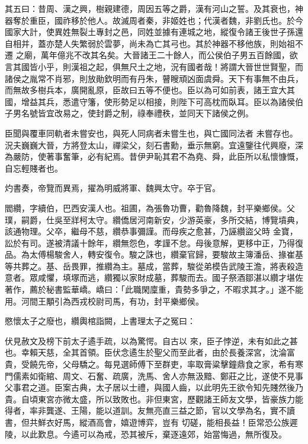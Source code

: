 \begin{pinyinscope}
 其五曰：昔周、漢之興，樹親建德，周因五等之爵，漢有河山之誓。及其衰也，神器奪於重臣，國祚移於他人。故滅周者秦，非姬姓也；代漢者魏，非劉氏也。於今國家大計，使異姓無裂土專封之邑，同姓並據有連城之地，縱復令諸王後世子孫還自相并，蓋亦楚人失繁弱於雲夢，尚未為亡其弓也。其於神器不移他族，則始祖不遷
 之廟，萬年億兆不改其名矣。大晉諸王二十餘人，而公侯伯子男五百餘國，欲言其國皆小乎，則漢祖之起，俱無尺土之地，況有國者哉！將謂大晉世世賢聖，而諸侯之胤常不肖邪，則放勛欽明而有丹朱，瞽瞍頑凶面虞舜。天下有事無不由兵，而無故多樹兵本，廣開亂原，臣故曰五等不便也。臣以為可如前表，諸王宜大其國，增益其兵，悉遣守籓，使形勢足以相接，則陛下可高枕而臥耳。臣以為諸侯伯子男名號皆宜改易之，使封爵之制，祿奉禮秩，並同天下諸侯之例。



 臣聞與覆車同軌者未嘗安也，與死人同病者未嘗生也，與亡國同法者
 未嘗存也。況夫巍巍大晉，方將登太山，禪梁父，刻石書勳，垂示無窮。宜遠鑒往代興廢，深為嚴防，使著事奮筆，必有紀焉。昔伊尹恥其君不為堯、舜，此臣所以私懷慷慨，自忘輕賤者也。



 灼書奏，帝覽而異焉，擢為明威將軍、魏興太守。卒于官。



 閻纘，字續伯，巴西安漢人也。祖圃，為張魯功曹，勸魯降魏，封平樂鄉侯。父璞，嗣爵，仕吳至牂柯太守。纘僑居河南新安，少游英豪，多所交結，博覽墳典，該通物理。父卒，繼母不慈，纘恭事彌謹。而母疾之愈甚，乃誣纘盜父時
 金寶，訟於有司。遂被清議十餘年，纘無怨色，孝謹不怠。母後意解，更移中正，乃得復品。為太傅楊駿舍人，轉安復令。駿之誅也，纘棄官歸，要駿故主簿潘岳、掾崔基等共葬之。基、岳畏罪，推纘為主。墓成，當葬，駿從弟模告武陵王澹，將表殺造意者。眾咸懼，填塚而逃，纘獨以家財成墓，葬駿而去。國子祭酒鄒湛以纘才堪佐著作，薦於秘書監華嶠。嶠曰：「此職閑廩重，貴勢多爭之，不暇求其才。」遂不能用。河間王顒引為西戎校尉司馬，有功，封平樂鄉侯。



 愍懷太子之廢也，纘輿棺詣闕，上書理太子之冤曰：



 伏見赦文及榜下前太子遹手疏，以為驚愕。自古以
 來，臣子悖逆，未有如此之甚也。幸賴天慈，全其首領。臣伏念遹生於聖父而至此者，由於長養深宮，沈淪富貴，受饒先帝，父母驕之。每見選師傅下至群吏，率取膏粱擊鐘鼎食之家，希有寒門儒素如衛綰、周文、石奮、疏廣，洗馬、舍人亦無汲黯、鄭莊之比，遂使不見事父事君之道。臣案古典，太子居以士禮，與國人齒，以此明先王欲令知先賤然後乃貴。自頃東宮亦微太盛，所以致敗也。非但東宮，歷觀諸王師友文學，皆豪族力能得者，率非龔遂、王陽，能以道訓。友無亮直三益之節，官以文學為名，實不讀書，但共鮮衣好馬，縱酒高會，嬉遊博弈，豈有
 切磋，能相長益！臣常恐公族遲陵，以此歎息。今遹可以為戒，恐其被斥，棄逐遠郊，始當悔過，無所復及。




\end{pinyinscope}
